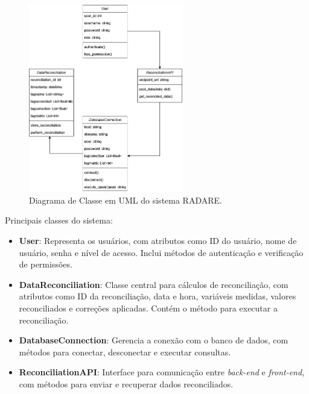 
\begin{figure}[htbp!]
	\centering
        \includegraphics[width=0.6\textwidth]{figuras/ClassDiagramRADARE.drawio.png}
	\caption{Diagrama de Classe em UML do sistema RADARE.}
	\label{fig:ClassDiagram}
\end{figure}

Principais classes do sistema:

\begin{itemize}
    \item \textbf{User}: Representa os usuários, com atributos como ID do usuário, nome de usuário, senha e nível de acesso. Inclui métodos de autenticação e verificação de permissões.
    
    \item \textbf{DataReconciliation}: Classe central para cálculos de reconciliação, com atributos como ID da reconciliação, data e hora, variáveis medidas, valores reconciliados e correções aplicadas. Contém o método para executar a reconciliação.
    
    \item \textbf{DatabaseConnection}: Gerencia a conexão com o banco de dados, com métodos para conectar, desconectar e executar consultas.
    
    \item \textbf{ReconciliationAPI}: Interface para comunicação entre \textit{back-end} e \textit{front-end}, com métodos para enviar e recuperar dados reconciliados.
\end{itemize}

